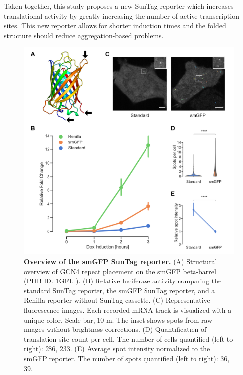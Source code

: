 Taken together, this study proposes a new SunTag reporter which increases translational activity by greatly increasing the number of active transcription sites.
This new reporter allows for shorter induction times and the folded structure should reduce aggregation-based problems.


\begin{figure}[h]
    \centering
    \includegraphics[width=\linewidth]{images/figure6}
    \caption{\textbf{Overview of the smGFP SunTag reporter.}
        (A) Structural overview of GCN4 repeat placement on the smGFP beta-barrel (PDB ID: 1GFL \cite{yang_molecular_1996}).
        (B) Relative luciferase activity comparing the standard SunTag reporter,
            the smGFP SunTag reporter, and a Renilla reporter without SunTag cassette.
        (C) Representative fluorescence images. Each recorded mRNA track is 
            visualized with a unique color. Scale bar, 10 \textmu m.
            The inset shows spots from raw images without brightness corrections.
        (D) Quantification of translation site count per cell.
            The number of cells quantified (left to right): 286, 233.
        (E) Average spot intensity normalized to the smGFP reporter.
            The number of spots quantified (left to right): 36, 39.
    }
    \label{fig:spaghetti}
\end{figure}